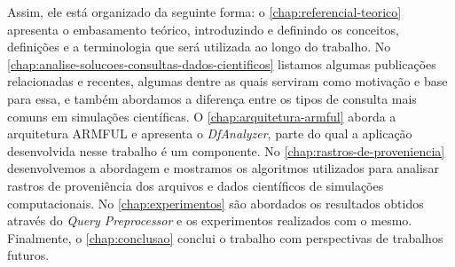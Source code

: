 Assim, ele está organizado da seguinte forma:
o \autoref{chap:referencial-teorico} apresenta o embasamento teórico, introduzindo e definindo os conceitos, definições e a terminologia que será utilizada ao longo do trabalho.
No \autoref{chap:analise-solucoes-consultas-dados-cientificos} listamos algumas publicações relacionadas e recentes, algumas dentre as quais serviram como motivação e base para essa, e também abordamos a diferença entre os tipos de consulta mais comuns em simulações científicas.
O \autoref{chap:arquitetura-armful} aborda a arquitetura ARMFUL e apresenta o \textit{DfAnalyzer}, parte do qual a aplicação desenvolvida nesse trabalho é um componente.
No \autoref{chap:rastros-de-proveniencia} desenvolvemos a abordagem e mostramos os algoritmos utilizados para analisar rastros de proveniência dos arquivos e dados científicos de simulações computacionais.
No \autoref{chap:experimentos} são abordados os resultados obtidos através do \textit{Query Preprocessor} e os experimentos realizados com o mesmo.
Finalmente, o \autoref{chap:conclusao} conclui o trabalho com perspectivas de trabalhos futuros.
